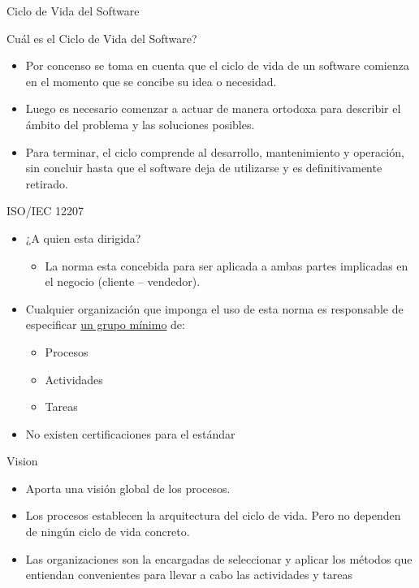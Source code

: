 \documentclass{beamer}
\begin{document}
				\begin{frame}{Ciclo de Vida del Software}
				\begin{center}
					\begin{center}
						{\huge Cu\'al es el Ciclo de Vida del Software?}
					\end{center}
					
					\begin{itemize}
					\pause
						\item Por concenso se toma en cuenta que el ciclo de vida de un software comienza en el momento que se concibe su idea o necesidad.\pause
						\item Luego es necesario comenzar a actuar de manera ortodoxa para describir el ámbito del problema y las soluciones posibles.\pause
						\item Para terminar, el ciclo comprende al desarrollo, mantenimiento y operación, sin concluir hasta que el software deja de utilizarse y es definitivamente retirado.
					\end{itemize}
				\end{center}
			\end{frame}
			
			
			\begin{frame}{ISO/IEC 12207}
				\begin{itemize}
					\item ¿A quien esta dirigida?
					\begin{itemize}
						\item La norma esta concebida para ser aplicada a ambas partes implicadas en el negocio (cliente – vendedor).
					\end{itemize}
					
					\item Cualquier organización que imponga el uso de esta norma es responsable de especificar \underline{un grupo mínimo} de:
				
					\begin{itemize}
						\item Procesos
						\item Actividades
						\item Tareas
					\end{itemize}
				
					\item No existen certificaciones para el estándar
				\end{itemize}
			\end{frame}

			\begin{frame}{Vision}
				\begin{itemize}
					\item Aporta una visión global de los procesos.
					\item Los procesos establecen la arquitectura del ciclo de vida. Pero no dependen de ningún ciclo de vida concreto.
					\item Las organizaciones son la encargadas de seleccionar y aplicar los métodos que entiendan convenientes para llevar a cabo las actividades y tareas
				\end{itemize}
			\end{frame}
			
\end{document}
